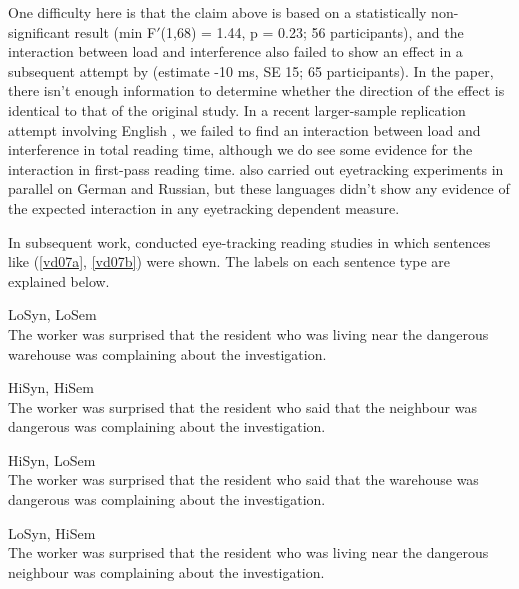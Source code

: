 \documentclass{cambridge7A}\usepackage[]{graphicx}\usepackage[]{color}
\begin{document}
One difficulty here is that
the claim above is based on a statistically non-significant result (min F$'$(1,68) = 1.44, p = 0.23; 56 participants), 
and the interaction between load and interference also failed to show an effect in a subsequent attempt by \cite{van2014low} (estimate -10 ms, SE 15; 65 participants). 
In the \cite{van2014low} paper, there isn't enough information to determine whether the direction of the effect is identical to that of the original study. In a recent larger-sample replication attempt involving English \citep{MertzenEtAlAMLaP2019}, we failed to find an interaction between load and interference in total reading time, although we do see some evidence for the interaction in first-pass reading time. \cite{MertzenEtAlAMLaP2019} also carried out eyetracking experiments in parallel on  German and Russian, but these languages didn't show any evidence of the expected interaction in any eyetracking dependent measure. 

 In subsequent work, \cite{VanDyke2007} conducted eye-tracking reading studies in which sentences like (\ref{vd07a},   \ref{vd07b}) were shown. The labels on each sentence type are explained below.

\begin{exe}
\ex \label{vd07a}
\begin{xlist}
\item LoSyn, LoSem\\
The worker was surprised that the resident who was living near the dangerous warehouse was complaining about the investigation.
\item HiSyn, HiSem\\
The worker was surprised that the resident who said that the neighbour was dangerous was complaining about the investigation.
\end{xlist}
\end{exe}

\begin{exe}
\ex\label{vd07b}
\begin{xlist}
\item HiSyn, LoSem\\
The worker was surprised that the resident who said that the warehouse was dangerous was complaining about the investigation.
\item LoSyn, HiSem\\
The worker was surprised that the resident who was living near the dangerous neighbour was complaining about the investigation.
\end{xlist}
\end{exe}
\end{document}
